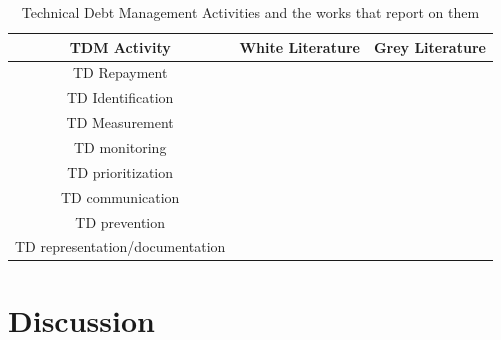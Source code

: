 \begin{table}[h!]

\centering
\begin{tabular}{|c|c|c|}
    \hline
    TDM Activity & White Literature & Grey Literature \\ \hline
    TD Repayment &~\cite{10.1145/3084226.3084248, 10.1145/3387906.3388623} &  \\ \hline
    TD Identification &~\cite{Klotins2018/3183519.3183539, CicoTradeoffs} & \\ \hline
    TD Measurement & &~\cite{Qualityv77:online, Whopayso60:online}\\ \hline
    TD monitoring &~\cite{Besker2018} & \\ \hline
 TD prioritization & ~\cite{9820390} &~\cite{techolut25:online, HowtoGet43:online}\\ \hline
TD communication & &~\cite{FowlerBottlenecks} \\ \hline
TD prevention &~\cite{SanchezGordon2016} &~\cite{Creating18:online}\\ \hline
TD representation/documentation &~\cite{Chicote:2017} & \\ \hline
    \end{tabular}

\caption{Technical Debt Management Activities and the works that report on them}
  \label{tab:TDMactivities}
\end{table}

\section{Discussion}\label{Sec:Discussion}





